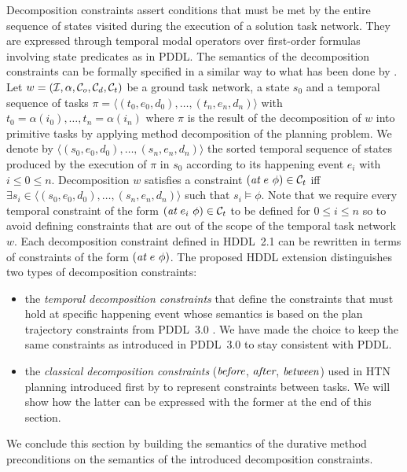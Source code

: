 \documentclass[letterpaper]{article} %
\newcommand{\at}{\text{\it at}}
\newcommand{\before}{\text{\it before}}
\newcommand{\after}{\text{\it after}}
\renewcommand{\between}{\text{\it between}}
\begin{document}
Decomposition constraints assert conditions that must be met by the entire sequence of states visited during the execution of a solution task network. They are expressed through temporal modal operators over first-order formulas involving state predicates as in PDDL. The semantics of the decomposition constraints can be formally specified in a similar way to what has been done by \citep{gerevini05}. Let $w = ({\cal{I}}, \alpha, {\cal{C}}_o, {\cal{C}}_d, {\cal{C}}_t)$ be a ground task network, a state $s_0$ and a temporal sequence of tasks $\pi = \langle (t_0, e_0, d_0), \ldots, (t_n, e_n, d_n) \rangle $ with $t_0 = \alpha(i_0), \ldots, t_n = \alpha(i_n)$ where $\pi$ is the result of the decomposition of $w$ into primitive tasks by applying method decomposition of the planning problem. We denote by $\langle (s_0, e_0, d_0), \ldots, (s_n, e_n, d_n) \rangle$ the sorted temporal sequence of states produced by the execution of $\pi$ in $s_0$ according to its happening event $e_i$ with $i \leq 0 \leq n$. Decomposition $w$ satisfies a constraint $(\at \ e \ \phi) \in {\cal{C}}_t$ iff $\exists s_i \in \langle (s_0, e_0, d_0), \ldots, (s_n, e_n, d_n) \rangle$ such that $s_i \models \phi$. Note that we require every temporal constraint of the form $(\at \ e_i \ \phi) \in {\cal{C}}_t$ to be defined for $0 \leq i \leq n$ so to avoid defining constraints that are out of the scope of the temporal task network $w$. Each decomposition constraint defined in HDDL~2.1 can be rewritten in terms of constraints of the form $(\at \ e\ \phi)$. The proposed HDDL extension distinguishes two types of decomposition constraints:
\begin{itemize}
    \item the {\em temporal decomposition constraints} that define the constraints that must hold at specific happening event whose semantics is based on the plan trajectory constraints from PDDL~3.0 \cite{gerevini05}. We have made the choice to keep the same constraints as introduced in PDDL~3.0 to stay consistent with PDDL.
    \item the {\em classical decomposition constraints} ($\before$, $\after$, $\between$) used in HTN planning introduced first by \citep{erol94} to represent constraints between tasks. We will show how the latter can be expressed with the former at the end of this section.
\end{itemize}

We conclude this section by building the semantics of the durative method preconditions on the semantics of the introduced decomposition constraints.
\end{document}
